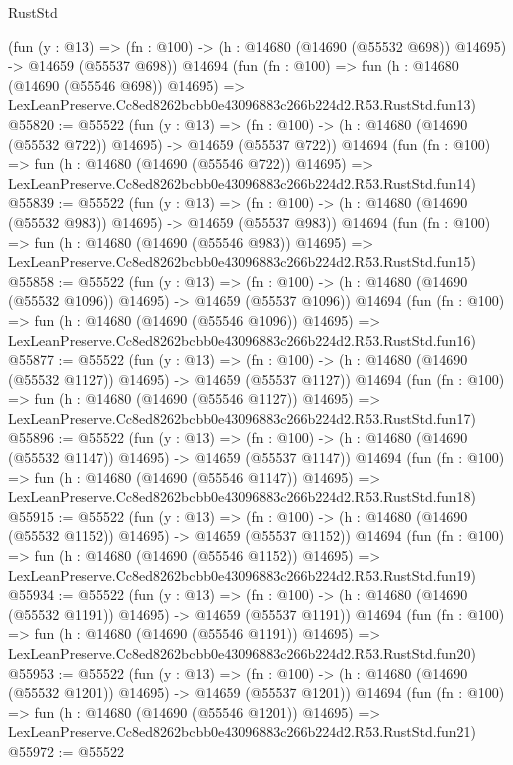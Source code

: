 \begin{lexlean}{RustStd}
\begin{coremodule}
    (fun (y : @13) =>
    (fn : @100) -> (h : @14680 (@14690 (@55532 @698)) @14695) -> @14659 (@55537 @698))
    @14694
    (fun (fn : @100) =>
    fun (h : @14680 (@14690 (@55546 @698)) @14695) =>
    LexLeanPreserve.Cc8ed8262bcbb0e43096883c266b224d2.R53.RustStd.fun13)
@55820 := @55522
    (fun (y : @13) =>
    (fn : @100) -> (h : @14680 (@14690 (@55532 @722)) @14695) -> @14659 (@55537 @722))
    @14694
    (fun (fn : @100) =>
    fun (h : @14680 (@14690 (@55546 @722)) @14695) =>
    LexLeanPreserve.Cc8ed8262bcbb0e43096883c266b224d2.R53.RustStd.fun14)
@55839 := @55522
    (fun (y : @13) =>
    (fn : @100) -> (h : @14680 (@14690 (@55532 @983)) @14695) -> @14659 (@55537 @983))
    @14694
    (fun (fn : @100) =>
    fun (h : @14680 (@14690 (@55546 @983)) @14695) =>
    LexLeanPreserve.Cc8ed8262bcbb0e43096883c266b224d2.R53.RustStd.fun15)
@55858 := @55522
    (fun (y : @13) =>
    (fn : @100) -> (h : @14680 (@14690 (@55532 @1096)) @14695) -> @14659 (@55537 @1096))
    @14694
    (fun (fn : @100) =>
    fun (h : @14680 (@14690 (@55546 @1096)) @14695) =>
    LexLeanPreserve.Cc8ed8262bcbb0e43096883c266b224d2.R53.RustStd.fun16)
@55877 := @55522
    (fun (y : @13) =>
    (fn : @100) -> (h : @14680 (@14690 (@55532 @1127)) @14695) -> @14659 (@55537 @1127))
    @14694
    (fun (fn : @100) =>
    fun (h : @14680 (@14690 (@55546 @1127)) @14695) =>
    LexLeanPreserve.Cc8ed8262bcbb0e43096883c266b224d2.R53.RustStd.fun17)
@55896 := @55522
    (fun (y : @13) =>
    (fn : @100) -> (h : @14680 (@14690 (@55532 @1147)) @14695) -> @14659 (@55537 @1147))
    @14694
    (fun (fn : @100) =>
    fun (h : @14680 (@14690 (@55546 @1147)) @14695) =>
    LexLeanPreserve.Cc8ed8262bcbb0e43096883c266b224d2.R53.RustStd.fun18)
@55915 := @55522
    (fun (y : @13) =>
    (fn : @100) -> (h : @14680 (@14690 (@55532 @1152)) @14695) -> @14659 (@55537 @1152))
    @14694
    (fun (fn : @100) =>
    fun (h : @14680 (@14690 (@55546 @1152)) @14695) =>
    LexLeanPreserve.Cc8ed8262bcbb0e43096883c266b224d2.R53.RustStd.fun19)
@55934 := @55522
    (fun (y : @13) =>
    (fn : @100) -> (h : @14680 (@14690 (@55532 @1191)) @14695) -> @14659 (@55537 @1191))
    @14694
    (fun (fn : @100) =>
    fun (h : @14680 (@14690 (@55546 @1191)) @14695) =>
    LexLeanPreserve.Cc8ed8262bcbb0e43096883c266b224d2.R53.RustStd.fun20)
@55953 := @55522
    (fun (y : @13) =>
    (fn : @100) -> (h : @14680 (@14690 (@55532 @1201)) @14695) -> @14659 (@55537 @1201))
    @14694
    (fun (fn : @100) =>
    fun (h : @14680 (@14690 (@55546 @1201)) @14695) =>
    LexLeanPreserve.Cc8ed8262bcbb0e43096883c266b224d2.R53.RustStd.fun21)
@55972 := @55522

\end{coremodule}
\end{lexlean}
